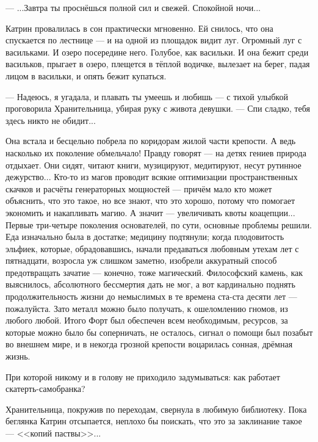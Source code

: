 --- ...Завтра ты проснёшься полной сил и свежей. Спокойной ночи...

Катрин провалилась в сон практически мгновенно. Ей снилось, что она спускается по лестнице ---
и на одной из площадок видит луг. Огромный луг с васильками. И озеро посередине него. Голубое, как васильки.
И она бежит среди васильков, прыгает в озеро, плещется в тёплой водичке, вылезает на берег, падая лицом в васильки,
и опять бежит купаться.

--- Надеюсь, я угадала, и плавать ты умеешь и любишь --- с тихой улыбкой проговорила Хранительница,
убирая руку с живота девушки. --- Спи сладко, тебя здесь никто не обидит...

Она встала и бесцельно побрела по коридорам жилой части крепости. А ведь насколько их поколение обмельчало!
Правду говорят --- на детях гениев природа отдыхает. Они сидят, читают книги, музицируют, медитируют,
несут рутинное дежурство... Кто-то из магов проводит всякие оптимизации пространственных скачков
и расчёты генераторных мощностей --- причём мало кто может объяснить, что это такое, но все знают, что это хорошо,
потому что помогает экономить и накапливать магию. А значит --- увеличивать квоты коацепции...
Первые три-четыре поколения основателей, по сути, основные проблемы решили. Еда изначально была в достатке;
медицину подтянули; когда плодовитость эльфиек, которые, обрадовавшись, начали предаваться любовным утехам лет с пятнадцати,
возросла уж слишком заметно, изобрели аккуратный способ предотвращать зачатие --- конечно, тоже магический.
Философский камень, как выяснилось, абсолютного бессмертия дать не мог,
а вот кардинально поднять продолжительность жизни до немыслимых в те времена ста-ста десяти лет --- пожалуйста.
Зато металл можно было получать, к ошеломлению гномов, из любого любой.
Итого Форт был обеспечен всем необходимым, ресурсов, за которые можно было бы соперничать, не осталось,
сигнал о помощи был позабыт во внешнем мире, и в некогда грозной крепости воцарилась сонная, дрёмная жизнь.

При которой никому и в голову не приходило задумываться: как работает скатерть-самобранка?

Хранительница, покружив по переходам, свернула в любимую библиотеку.
Пока беглянка Катрин отсыпается, неплохо бы поискать, что это за заклинание такое --- <<копий паствы>>...
